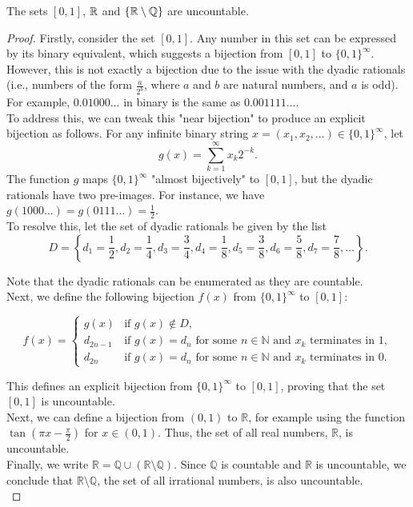 \begin{corollary}
    The sets $[0, 1]$, $\mathbb{R}$ and $\{\mathbb{R} \setminus \mathbb{Q}\}$ are uncountable.
\end{corollary}

\begin{proof}
    Firstly, consider the set $[0, 1]$. Any number in this set can be expressed by its binary equivalent, which suggests a bijection from $[0, 1]$ to $\{0, 1\}^\infty$. However, this is not exactly a bijection due to the issue with the dyadic rationals (i.e., numbers of the form $\frac{a}{2^b}$, where $a$ and $b$ are natural numbers, and $a$ is odd). For example, $0.01000\ldots$ in binary is the same as $0.001111\ldots$. \\ 

To address this, we can tweak this "near bijection" to produce an explicit bijection as follows. For any infinite binary string $x = (x_1, x_2, \ldots) \in \{0, 1\}^\infty$, let
\[
g(x) = \sum_{k=1}^{\infty} x_k 2^{-k}.
\]
The function $g$ maps $\{0, 1\}^\infty$ "almost bijectively" to $[0, 1]$, but the dyadic rationals have two pre-images. For instance, we have $g(1000\ldots) = g(0111\ldots) = \frac{1}{2}$. \\

To resolve this, let the set of dyadic rationals be given by the list
\[
D = \left\{ 
d_1 = \frac{1}{2}, d_2 = \frac{1}{4}, d_3 = \frac{3}{4}, d_4 = \frac{1}{8}, d_5 = \frac{3}{8}, d_6 = \frac{5}{8}, d_7 = \frac{7}{8}, \ldots 
\right\}.
\]

Note that the dyadic rationals can be enumerated as they are countable. \\

Next, we define the following bijection $f(x)$ from $\{0, 1\}^\infty$ to $[0, 1]$:

\[
f(x) =
\begin{cases}
g(x) & \text{if } g(x) \notin D, \\
d_{2n-1} & \text{if } g(x) = d_n \text{ for some } n \in \mathbb{N} \text{ and } x_k \text{ terminates in } 1, \\
d_{2n} & \text{if } g(x) = d_n \text{ for some } n \in \mathbb{N} \text{ and } x_k \text{ terminates in } 0.
\end{cases}
\]

This defines an explicit bijection from $\{0, 1\}^\infty$ to $[0, 1]$, proving that the set $[0, 1]$ is uncountable. \\

Next, we can define a bijection from $(0, 1)$ to $\mathbb{R}$, for example using the function $\tan\left(\pi x - \frac{\pi}{2}\right)$ for $x \in (0, 1)$. Thus, the set of all real numbers, $\mathbb{R}$, is uncountable. \\

Finally, we write $\mathbb{R} = \mathbb{Q} \cup (\mathbb{R} \setminus \mathbb{Q})$. Since $\mathbb{Q}$ is countable and $\mathbb{R}$ is uncountable, we conclude that $\mathbb{R} \setminus \mathbb{Q}$, the set of all irrational numbers, is also uncountable. \\

\end{proof}


